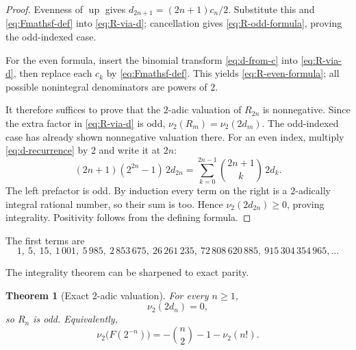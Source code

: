\documentclass[11pt,oneside]{article}
\newtheorem{theorem}{Theorem}[section]
\theoremstyle{definition}
\theoremstyle{remark}
\newcommand{\upf}{\operatorname{up}}
\begin{document}
\begin{proof}
Evenness of $\upf$ gives
$d_{2n+1}=(2n+1)c_n/2$.  Substitute this and
\eqref{eq:Fmathsf-def} into \eqref{eq:R-via-d}; cancellation gives
\eqref{eq:R-odd-formula}, proving the odd-indexed case.

For the even formula, insert the binomial transform
\eqref{eq:d-from-c} into \eqref{eq:R-via-d}, then replace each $c_k$ by
\eqref{eq:Fmathsf-def}.  This yields \eqref{eq:R-even-formula}; all possible
nonintegral denominators are powers of $2$.

It therefore suffices to prove that the $2$-adic valuation of $R_{2n}$ is
nonnegative.  Since the extra factor in \eqref{eq:R-via-d} is odd,
$\nu_2(R_m)=\nu_2(2d_m)$.  The odd-indexed case has already shown nonnegative
valuation there.  For an even index, multiply \eqref{eq:d-recurrence} by $2$ and
write it at $2n$:
\begin{equation}\label{eq:2d-even-induction}
 (2n+1)(2^{2n}-1)\,2d_{2n}
 =\sum_{k=0}^{2n-1}\binom{2n+1}{k}\,2d_k.
\end{equation}
The left prefactor is odd.  By induction every term on the right is a
$2$-adically integral rational number, so their sum is too.  Hence
$\nu_2(2d_{2n})\ge0$, proving integrality.  Positivity follows from the defining
formula.
\end{proof}

The first terms are
\begin{equation}\label{eq:first-R-values}
  1,\ 5,\ 15,\ 1\,001,\ 5\,985,\ 2\,853\,675,\ 26\,261\,235,
  \ 72\,808\,620\,885,\ 915\,304\,354\,965,\ldots
\end{equation}

The integrality theorem can be sharpened to exact parity.

\begin{theorem}[Exact $2$-adic valuation]\label{thm:exact-two-adic}
For every $n\ge1$,
\begin{equation}\label{eq:2d-valuation-zero}
  \nu_2(2d_n)=0,
\end{equation}
so $R_n$ is odd.  Equivalently,
\begin{equation}\label{eq:F-inverse-valuation}
  \nu_2\bigl(F(2^{-n})\bigr)
  =-\binom n2-1-\nu_2(n!).
\end{equation}
\end{theorem}
\end{document}
